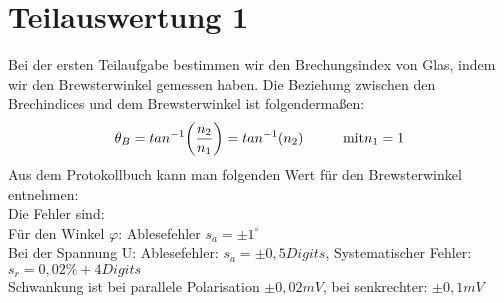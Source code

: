 

\section{Teilauswertung 1}
Bei der ersten Teilaufgabe bestimmen wir den Brechungsindex von Glas, indem wir den Brewsterwinkel gemessen haben. 
Die Beziehung zwischen den Brechindices und dem Brewsterwinkel ist folgendermaßen:\\
\begin{equation}
\theta_B=tan^{-1}\biggl( \frac{n_2}{n_1}\biggr)=tan^{-1}(n_2)  \tab \text{mit} n_1=1
\end{equation}
Aus dem Protokollbuch kann man folgenden Wert für den Brewsterwinkel entnehmen:\\
Die Fehler sind:\\
Für den Winkel $\varphi$: 
Ablesefehler $s_a=\pm1^\circ$\\
Bei der Spannung U: Ablesefehler: $s_a=\pm0,5 Digits$, Systematischer Fehler: $s_r=0,02\% + 4Digits$\\
Schwankung ist bei parallele Polarisation $\pm0,02mV$, bei senkrechter: $\pm0,1mV$\\

